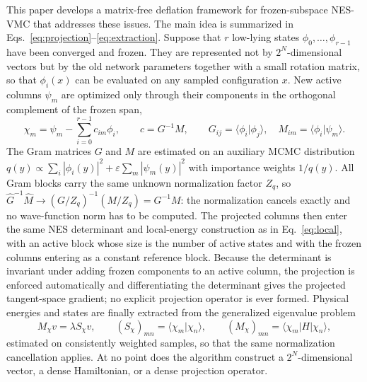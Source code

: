 \documentclass[11pt,a4paper]{article}
\newcommand{\braket}[2]{\langle #1\vert #2\rangle}
\newcommand{\bramat}[3]{\langle #1\vert #2\vert #3\rangle}
\begin{document}
This paper develops a matrix-free deflation framework for frozen-subspace NES-VMC that addresses these issues. The main idea is summarized in Eqs.~\eqref{eq:projection}--\eqref{eq:extraction}. Suppose that $r$ low-lying states $\phi_0,\ldots,\phi_{r-1}$ have been converged and frozen. They are represented not by $2^N$-dimensional vectors but by the old network parameters together with a small rotation matrix, so that $\phi_i(x)$ can be evaluated on any sampled configuration $x$. New active columns $\psi_m$ are optimized only through their components in the orthogonal complement of the frozen span,
\begin{equation}
\chi_m=\psi_m-\sum_{i=0}^{r-1}c_{im}\phi_i,
\qquad
c=G^{-1}M,
\qquad
G_{ij}=\braket{\phi_i}{\phi_j},
\quad
M_{im}=\braket{\phi_i}{\psi_m}.
\label{eq:projection}
\end{equation}
The Gram matrices $G$ and $M$ are estimated on an auxiliary MCMC distribution
$q(y)\propto\sum_i|\phi_i(y)|^2+\varepsilon\sum_m|\psi_m(y)|^2$ with importance weights $1/q(y)$. All Gram blocks carry the same unknown normalization factor $Z_q$, so
$\hat G^{-1}\hat M\to(G/Z_q)^{-1}(M/Z_q)=G^{-1}M$: the normalization cancels exactly and no wave-function norm has to be computed. The projected columns then enter the same NES determinant and local-energy construction as in Eq.~\eqref{eq:local}, with an active block whose size is the number of active states and with the frozen columns entering as a constant reference block. Because the determinant is invariant under adding frozen components to an active column, the projection is enforced automatically and differentiating the determinant gives the projected tangent-space gradient; no explicit projection operator is ever formed. Physical energies and states are finally extracted from the generalized eigenvalue problem
\begin{equation}
M_\chi v=\lambda S_\chi v,
\qquad
(S_\chi)_{mn}=\braket{\chi_m}{\chi_n},
\qquad
(M_\chi)_{mn}=\bramat{\chi_m}{H}{\chi_n},
\label{eq:extraction}
\end{equation}
estimated on consistently weighted samples, so that the same normalization cancellation applies. At no point does the algorithm construct a $2^N$-dimensional vector, a dense Hamiltonian, or a dense projection operator.
\end{document}
